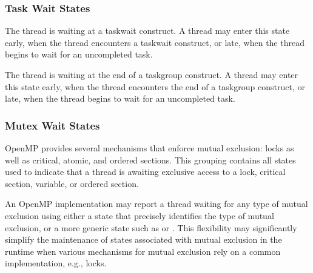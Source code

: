 \subsubsection{Task Wait States}

\begin{description}

\item {} 

  The thread is waiting at a taskwait construct. A 
  thread may enter this state early, when the
  thread encounters a taskwait construct, or late, when the thread
  begins to wait for an uncompleted task.

\item {} 

  The thread is waiting at the end of a taskgroup construct. A 
  thread may enter this state early, when the
  thread encounters the end of a taskgroup construct, or late, when the thread
  begins to wait for an uncompleted task.

\end{description}


\subsubsection{Mutex Wait States}

OpenMP provides several mechanisms that enforce mutual exclusion:
locks as well as critical, atomic, and ordered sections.  This
grouping contains all states used to indicate that a thread is
awaiting exclusive access to a lock, critical section, variable,
or ordered section.

An OpenMP implementation may report a thread waiting for any type
of mutual exclusion using either a state that precisely identifies
the type of mutual exclusion, or  a more generic state such as
 or .  This
flexibility may significantly simplify the maintenance of states
associated with mutual exclusion in the runtime when various
mechanisms for mutual exclusion rely on a common implementation,
e.g., locks.


